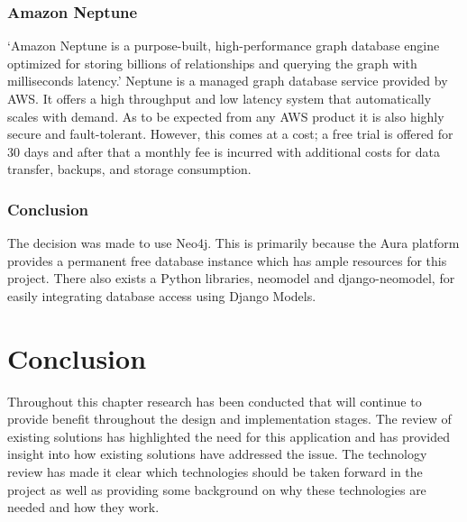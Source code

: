 \subsubsection*{Amazon Neptune}
`Amazon Neptune is a purpose-built, high-performance graph database engine optimized for storing billions of 
relationships and querying the graph with milliseconds latency.'\cite{WhatGraphDatabase} Neptune is a managed graph 
database service provided by AWS. It offers a high throughput and low latency system that automatically scales with 
demand. As to be expected from any AWS product it is also highly secure and fault-tolerant. However, this comes at a 
cost; a free trial is offered for 30 days and after that a monthly fee is incurred with additional costs for data 
transfer, backups, and storage consumption.
\subsubsection*{Conclusion}
The decision was made to use Neo4j. This is primarily because the Aura platform provides a permanent free database 
instance which has ample resources for this project. There also exists a Python libraries, neomodel and django-neomodel,
 for easily integrating database access using Django Models. 
\section{Conclusion}
Throughout this chapter research has been conducted that will continue to provide benefit throughout the design and 
implementation stages. The review of existing solutions has highlighted the need for this application and has provided 
insight into how existing solutions have addressed the issue. The technology review has made it clear which technologies
 should be taken forward in the project as well as providing some background on why these technologies are needed and 
how they work.
